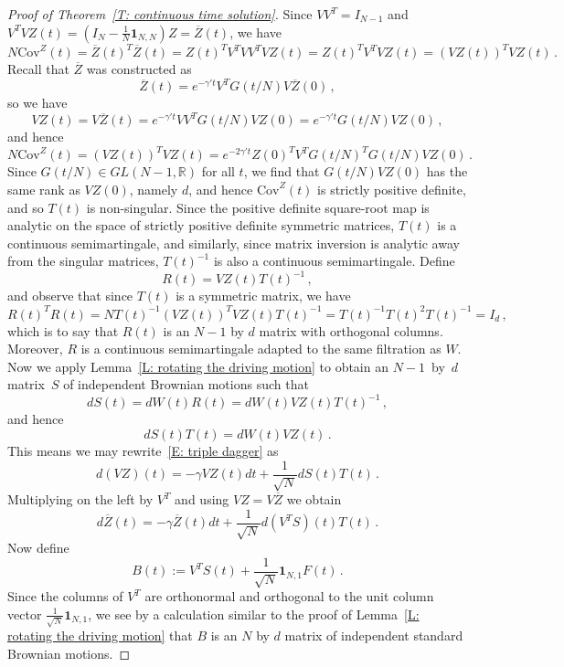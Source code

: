 \documentclass[12pt]{article}
\newcommand{\1}{\mathbf{1}}
\begin{document}
\begin{proof}[Proof of Theorem~\ref{T: continuous time solution}]
Since $VV^T = I_{N-1}$ and $V^T VZ(t) = \left(I_{N} - \frac{1}{N}\mathbf{1}_{N,N}\right) Z = \overline{Z}(t)$, we have
$$ N \mathrm{Cov}^Z(t) = \overline{Z}(t)^T \overline{Z}(t) = Z(t)^T V^T V V^T VZ(t) = Z(t)^T V^T V Z(t) = (VZ(t))^T VZ(t)\,.$$
Recall that $\overline{Z}$ was constructed as
$$ \overline{Z}(t) = e^{-\gamma' t} V^T G(t/N) V \overline{Z}(0)\,, $$
so we have
$$ VZ(t) = V\overline{Z}(t) = e^{-\gamma' t} VV^T G(t/N) VZ(0) = e^{-\gamma' t}  G(t/N) VZ(0)\,,$$ and hence
\begin{equation}\label{E: Cov Z expression} N \mathrm{Cov}^Z(t) = (VZ(t))^T VZ(t) = e^{-2\gamma' t} Z(0)^T V^T G(t/N)^T G(t/N) VZ(0)\,.
\end{equation}
Since $G(t/N) \in GL(N-1,\mathbb{R})$ for all $t$, we find that $G(t/N) VZ(0)$ has the same rank as $VZ(0)$, namely $d$, and hence $\mathrm{Cov}^Z(t)$ is strictly positive definite, and so $T(t)$ is non-singular. Since the positive definite square-root map is analytic on the space of {strictly} positive definite symmetric matrices, $T(t)$ is a continuous semimartingale, and {similarly, since matrix inversion is analytic away from the singular matrices, $T(t)^{-1}$ is also a continuous semimartingale}.
Define $$R(t) = VZ(t) T(t)^{-1}\,,$$ and observe that since $T(t)$ is a symmetric matrix, we have
$$ 
R(t)^T R(t) = N T(t)^{-1}(VZ(t))^T VZ(t) T(t)^{-1} = T(t)^{-1} T(t)^2 T(t)^{-1} = I_d\,,
$$ 
which is to say that $R(t)$ is an $N-1$ by $d$ matrix with orthogonal columns. Moreover, $R$ is a continuous semimartingale adapted to the same filtration as $W$.  Now we apply Lemma~\ref{L: rotating the driving motion} to obtain an $N-1$~by~$d$ matrix~$S$ of independent Brownian motions such that
$$ 
dS(t) = dW(t) R(t) = dW(t) VZ(t) T(t)^{-1}\,,
$$
and hence
$$ dS(t) T(t) = dW(t) VZ(t)\,.$$ This means we may rewrite~\eqref{E: triple dagger} as
\begin{equation}\label{E: quadruple dagger}
d(VZ)(t)  = -\gamma VZ(t) dt + \frac{1}{\sqrt{N}}dS(t)T(t)\,.
\end{equation}
Multiplying on the left by $V^T$ and using $VZ = V\overline{Z}$ we obtain
\begin{equation}\label{E: quintuple dagger}
d\overline{Z}(t)  = -\gamma \overline{Z}(t) dt + \frac{1}{\sqrt{N}}d(V^TS)(t)T(t)\,.
\end{equation}
Now define 
\begin{equation}\label{E: B def} B(t) := V^T S(t) + \frac{1}{\sqrt{N}}\mathbf{1}_{N,1} F(t)\,.\end{equation}
Since the columns of $V^T$ are orthonormal and orthogonal to the unit column vector $\frac{1}{\sqrt{N}}\mathbf{1}_{N,1}$, we see by a calculation similar to the proof of Lemma~\ref{L: rotating the driving motion} that $B$ is an $N$ by $d$ matrix of independent standard Brownian motions. 


\end{proof}
\end{document}
